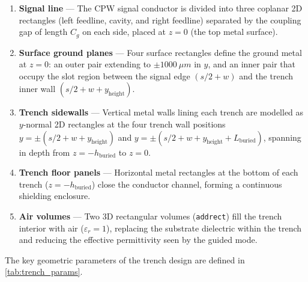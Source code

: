 \documentclass[12pt,a4paper]{article}
\begin{document}
\begin{enumerate}
    \item \textbf{Signal line} --- The CPW signal conductor is divided
          into three coplanar 2D rectangles (left feedline, cavity, and
          right feedline) separated by the coupling gap of length
          $C_g$ on each side, placed at $z = 0$ (the top metal surface).

    \item \textbf{Surface ground planes} --- Four surface rectangles
          define the ground metal at $z = 0$: an outer pair extending
          to $\pm\SI{1000}{\mu m}$ in $y$, and an inner pair that
          occupy the slot region between the signal edge $(s/2 + w)$
          and the trench inner wall $(s/2 + w + y_{\mathrm{height}})$.

    \item \textbf{Trench sidewalls} --- Vertical metal walls lining each
          trench are modelled as $y$-normal 2D rectangles at the four
          trench wall positions
          $y = \pm(s/2 + w + y_{\mathrm{height}})$ and
          $y = \pm(s/2 + w + y_{\mathrm{height}} + L_{\mathrm{buried}})$,
          spanning in depth from $z = -h_{\mathrm{buried}}$ to
          $z = 0$.

    \item \textbf{Trench floor panels} --- Horizontal metal rectangles
          at the bottom of each trench ($z = -h_{\mathrm{buried}}$)
          close the conductor channel, forming a continuous shielding
          enclosure.

    \item \textbf{Air volumes} --- Two 3D rectangular volumes
          (\texttt{addrect}) fill the trench interior with air
          ($\varepsilon_r = 1$), replacing the substrate dielectric
          within the trench and reducing the effective permittivity
          seen by the guided mode.
\end{enumerate}

The key geometric parameters of the trench design are defined in
\cref{tab:trench_params}.
\end{document}
